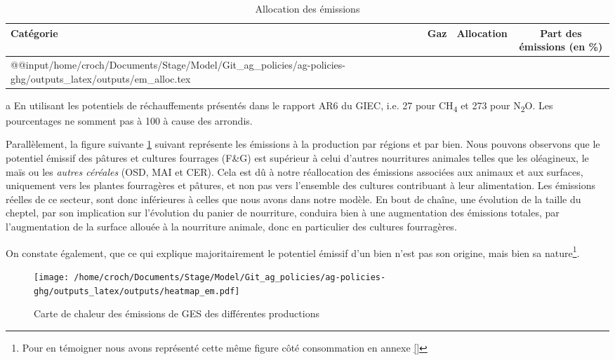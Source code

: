 \begin{table}[h!]
    \centering
    \begin{threeparttable}
        \begin{tabularx}{\textwidth}{p{1.5in}p{1.2in}p{1.2in}c}
            \textbf{Catégorie} & \textbf{Gaz} & \textbf{Allocation} & \textbf{Part des émissions}\tnote{a} (en \%) \\ \hline
            \csname @@input\endcsname /home/croch/Documents/Stage/Model/Git_ag_policies/ag-policies-ghg/outputs_latex/outputs/em_alloc.tex
            \hline
        \end{tabularx}
        \begin{tablenotes}
            \footnotesize
            \item[a] En utilisant les potentiels de réchauffements présentés dans le rapport AR6 du GIEC, i.e. 27 pour CH\textsubscript{4} et 273 pour N\textsubscript{2}O. Les pourcentages ne somment pas à 100 à cause des arrondis.
        \end{tablenotes}
        \caption{Allocation des émissions}
        \label{tab:em_allocation}
    \end{threeparttable}
\end{table}

Parallèlement, la figure suivante \ref{fig:em} suivant représente les émissions à la production par régions et par bien. Nous pouvons observons que le potentiel émissif des pâtures et cultures fourrages (F\&G) est supérieur à celui d'autres nourritures animales telles que les oléagineux, le maïs ou les \textit{autres céréales} (OSD, MAI et CER). Cela est dû à notre réallocation des émissions associées aux animaux et aux surfaces, uniquement vers les plantes fourragères et pâtures, et non pas vers l'ensemble des cultures contribuant à leur alimentation. Les émissions réelles de ce secteur, sont donc inférieures à celles que nous avons dans notre modèle. En bout de chaîne, une évolution de la taille du cheptel, par son implication sur l'évolution du panier de nourriture, conduira bien à une augmentation des émissions totales, par l'augmentation de la surface allouée à la nourriture animale, donc en particulier des cultures fourragères.

On constate également, que ce qui explique majoritairement le potentiel émissif d'un bien n'est pas son origine, mais bien sa nature\footnote{Pour en témoigner nous avons représenté cette même figure côté consommation en annexe \ref{}}.

\begin{figure}[h!]
    \centering
    \centering
    \texttt{[image: /home/croch/Documents/Stage/Model/Git\_ag\_policies/ag-policies-ghg/outputs\_latex/outputs/heatmap\_em.pdf]}
    \caption{Carte de chaleur des émissions de GES des différentes productions}
    \label{fig:em}
\end{figure}

